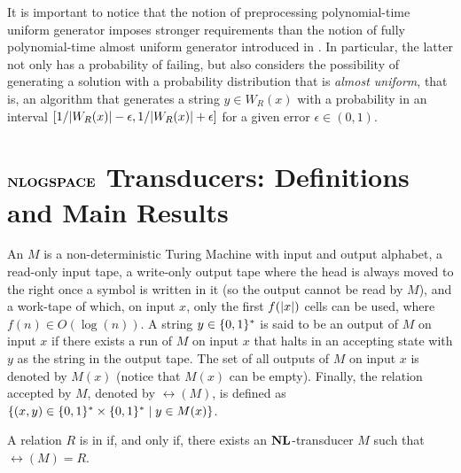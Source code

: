 \documentclass[11pt,twoside=off,numbers=noenddot]{scrbook}
\begin{document}
It is important to notice that the notion of preprocessing polynomial-time   uniform generator imposes stronger requirements than the notion of fully polynomial-time almost uniform generator introduced in \cite{jerrum1986random}. In particular, the latter not only has a probability of failing, but also considers the possibility of generating a solution with a probability distribution that is \emph{almost uniform}, that is, an algorithm that generates a string $y \in W_R(x)$ with a probability in an interval $[1 / | W_R(x) | - \epsilon, 1 / | W_R(x) | + \epsilon]$ for a given error $\epsilon \in (0, 1)$.

\chapter{$\textbf{NLOGSPACE}$ Transducers: Definitions and Main Results}
\begin{definition}[$\NL$-transducer]
    An  $M$ is a non-deterministic Turing Machine with input and output alphabet, a read-only input tape, a write-only output tape where the head is always moved to the right once a symbol is written in it (so the output cannot be read by $M$), and a work-tape of which, on input $x$, only the first $f(| x |)$ cells can be used, where $f(n) \in O(\log(n))$. A string $y \in \{ 0, 1 \}^\ast$ is said to be an output of $M$ on input $x$ if there exists a run of $M$ on input $x$ that halts in an accepting state with $y$ as the string in the output tape. The set of all outputs of $M$ on input $x$ is denoted by $M(x)$ (notice that $M(x)$ can be empty). Finally, the relation accepted by $M$, denoted by $\rel(M)$, is defined as $\{ (x, y) \in \{ 0, 1 \}^\ast \times \{ 0, 1 \}^\ast \mid y \in M(x) \}$.
\end{definition}

\begin{definition}[$\RelationNL$]
    A relation $R$ is in \vocab{$\RelationNL$} if, and only if, there exists an $\NL$-transducer $M$ such that $\rel(M) = R$.
\end{definition}

 
\end{document}
